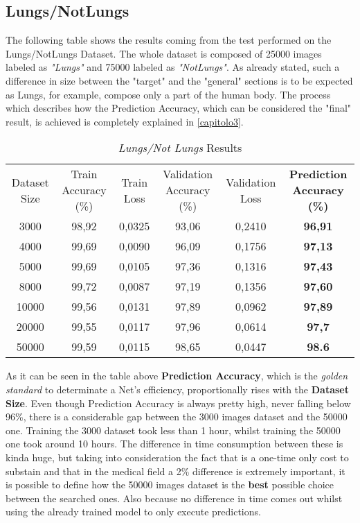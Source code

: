 \documentclass[../main.tex]{subfiles}
\begin{document}
\subsection{Lungs/NotLungs}
The following table shows the results coming from the test performed on the Lungs/NotLungs Dataset. The whole dataset is composed of 25000 images labeled as \textit{"Lungs"} and 75000 labeled as \textit{"NotLungs"}. As already stated, such a difference in size between the "target" and the "general" sections is to be expected as Lungs, for example, compose only a part of the human body. The process which describes how the Prediction Accuracy, which can be considered the "final" result, is achieved is completely explained in \ref{capitolo3}.
\begin{table}
\begin{tabular}{cccccc}
Dataset Size & Train Accuracy (\%) & Train Loss & Validation Accuracy (\%) & Validation Loss & \textbf{Prediction Accuracy (\%)} \\
3000         & 98,92          & 0,0325     & 93,06               & 0,2410          & \textbf{96,91}               \\
4000         & 99,69          & 0,0090     & 96,09               & 0,1756          & \textbf{97,13}               \\
5000         & 99,69          & 0,0105     & 97,36               & 0,1316          & \textbf{97,43}               \\
8000         & 99,72          & 0,0087     & 97,19               & 0,1356          & \textbf{97,60}               \\
10000        & 99,56          & 0,0131     & 97,89               & 0,0962          & \textbf{97,89}               \\
20000        & 99,55          & 0,0117     & 97,96               & 0,0614          & \textbf{97,7}                \\
50000        & 99,59          & 0,0115     & 98,65               & 0,0447          & \textbf{98.6}               
\end{tabular}
\caption{\textit{Lungs/Not Lungs} Results}
\label{table:LNLres}
\end{table}

As it can be seen in the table above \textbf{Prediction Accuracy}, which is the \textit{golden standard} to determinate a Net's efficiency, proportionally rises with the \textbf{Dataset Size}. Even though Prediction Accuracy is always pretty high, never falling below 96\%, there is a considerable gap between the 3000 images dataset and the 50000 one. Training the 3000 dataset took less than 1 hour, whilst training the 50000 one took around 10 hours. The difference in time consumption between these is kinda huge, but taking into consideration the fact that is a one-time only cost to substain and that in the medical field a 2\% difference is extremely important, it is possible to define how the 50000 images dataset is the \textbf{best} possible choice between the searched ones. Also because no difference in time comes out whilst using the already trained model to only execute predictions.
\end{document}
